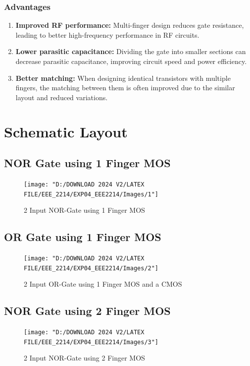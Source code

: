 \documentclass[a4paper,12pt]{article}
\begin{document}
	\subsubsection{Advantages}
	\begin{enumerate}
		\item 	\textbf{Improved RF performance:} Multi-finger design reduces gate resistance, leading to better high-frequency performance in RF circuits. 
		\item 	\textbf{Lower parasitic capacitance:} Dividing the gate into smaller sections can decrease parasitic capacitance, improving circuit speed and power efficiency. 
		\item \textbf{	Better matching:} When designing identical transistors with multiple fingers, the matching between them is often improved due to the similar layout and reduced variations.
	\end{enumerate}
	
	
	
	
	\newpage
	\section{Schematic Layout }
	\subsection{NOR Gate using 1 Finger MOS}
	\begin{figure}[H]
		\centering
		\texttt{[image: "D:/DOWNLOAD 2024 V2/LATEX FILE/EEE\_2214/EXP04\_EEE2214/Images/1"]}
		\caption{2 Input NOR-Gate using 1 Finger MOS}
		\label{fig:4}
	\end{figure}
	
	\subsection{OR Gate using 1 Finger MOS}
	
	\vspace{2cm}
	\begin{figure}[H]
		\centering
		\texttt{[image: "D:/DOWNLOAD 2024 V2/LATEX FILE/EEE\_2214/EXP04\_EEE2214/Images/2"]}
		\caption{2 Input OR-Gate using 1 Finger MOS and a CMOS}
		\label{fig:5}
	\end{figure}
	\subsection{NOR Gate using 2 Finger MOS}
	\vspace{1.5cm}
	\begin{figure}[H]
		\centering
		\texttt{[image: "D:/DOWNLOAD 2024 V2/LATEX FILE/EEE\_2214/EXP04\_EEE2214/Images/3"]}
		\caption{2 Input NOR-Gate using 2 Finger MOS }
		\label{fig:1}
	\end{figure}
	
\end{document}
